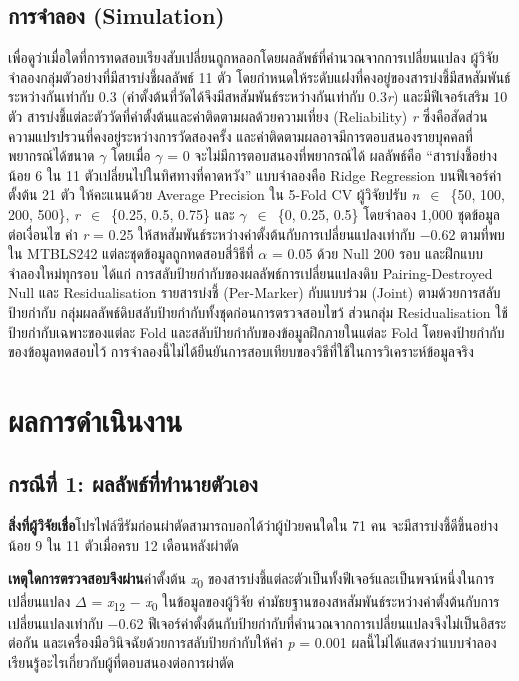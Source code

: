 \documentclass[11pt,a4paper]{article}
\newcommand{\storylabel}[1]{\textbf{#1}\quad}
\begin{document}
\subsection{การจำลอง (Simulation)}
\label{sec:simdesign}
เพื่อดูว่าเมื่อใดที่การทดสอบเรียงสับเปลี่ยนถูกหลอกโดยผลลัพธ์ที่คำนวณจากการเปลี่ยนแปลง
ผู้วิจัยจำลองกลุ่มตัวอย่างที่มีสารบ่งชี้ผลลัพธ์ 11 ตัว
โดยกำหนดให้ระดับแฝงที่คงอยู่ของสารบ่งชี้มีสหสัมพันธ์ระหว่างกันเท่ากับ 0.3
(ค่าตั้งต้นที่วัดได้จึงมีสหสัมพันธ์ระหว่างกันเท่ากับ 0.3\textit{r}) และมีฟีเจอร์เสริม 10 ตัว
สารบ่งชี้แต่ละตัววัดที่ค่าตั้งต้นและค่าติดตามผลด้วยความเที่ยง (Reliability) \textit{r}
ซึ่งคือสัดส่วนความแปรปรวนที่คงอยู่ระหว่างการวัดสองครั้ง
และค่าติดตามผลอาจมีการตอบสนองรายบุคคลที่พยากรณ์ได้ขนาด $\gamma$
โดยเมื่อ $\gamma$ = 0 จะไม่มีการตอบสนองที่พยากรณ์ได้
ผลลัพธ์คือ ``สารบ่งชี้อย่างน้อย 6 ใน 11 ตัวเปลี่ยนไปในทิศทางที่คาดหวัง''
แบบจำลองคือ Ridge Regression บนฟีเจอร์ค่าตั้งต้น 21 ตัว
ให้คะแนนด้วย Average Precision ใน 5-Fold CV
ผู้วิจัยปรับ \textit{n}~$\in$~\{50, 100, 200, 500\},
\textit{r}~$\in$~\{0.25, 0.5, 0.75\} และ $\gamma$~$\in$~\{0, 0.25, 0.5\}
โดยจำลอง 1,000 ชุดข้อมูลต่อเงื่อนไข ค่า \textit{r} = 0.25
ให้สหสัมพันธ์ระหว่างค่าตั้งต้นกับการเปลี่ยนแปลงเท่ากับ −0.62 ตามที่พบใน MTBLS242
แต่ละชุดข้อมูลถูกทดสอบสี่วิธีที่ $\alpha$ = 0.05 ด้วย Null 200 รอบ
และฝึกแบบจำลองใหม่ทุกรอบ ได้แก่ การสลับป้ายกำกับของผลลัพธ์การเปลี่ยนแปลงดิบ
Pairing-Destroyed Null และ Residualisation รายสารบ่งชี้ (Per-Marker)
กับแบบร่วม (Joint) ตามด้วยการสลับป้ายกำกับ
กลุ่มผลลัพธ์ดิบสลับป้ายกำกับทั้งชุดก่อนการตรวจสอบไขว้
ส่วนกลุ่ม Residualisation ใช้ป้ายกำกับเฉพาะของแต่ละ Fold
และสลับป้ายกำกับของข้อมูลฝึกภายในแต่ละ Fold โดยคงป้ายกำกับของข้อมูลทดสอบไว้
การจำลองนี้ไม่ได้ยืนยันการสอบเทียบของวิธีที่ใช้ในการวิเคราะห์ข้อมูลจริง

\section{ผลการดำเนินงาน}
\label{sec:results}

\subsection{กรณีที่ 1: ผลลัพธ์ที่ทำนายตัวเอง}
\label{sec:case1}

\storylabel{สิ่งที่ผู้วิจัยเชื่อ}โปรไฟล์ซีรัมก่อนผ่าตัดสามารถบอกได้ว่าผู้ป่วยคนใดใน 71 คน
จะมีสารบ่งชี้ดีขึ้นอย่างน้อย 9 ใน 11 ตัวเมื่อครบ 12 เดือนหลังผ่าตัด

\storylabel{เหตุใดการตรวจสอบจึงผ่าน}ค่าตั้งต้น \textit{x}\textsubscript{0}
ของสารบ่งชี้แต่ละตัวเป็นทั้งฟีเจอร์และเป็นพจน์หนึ่งในการเปลี่ยนแปลง
$\Delta$ = \textit{x}\textsubscript{12} − \textit{x}\textsubscript{0}
ในข้อมูลของผู้วิจัย ค่ามัธยฐานของสหสัมพันธ์ระหว่างค่าตั้งต้นกับการเปลี่ยนแปลงเท่ากับ −0.62
ฟีเจอร์ค่าตั้งต้นกับป้ายกำกับที่คำนวณจากการเปลี่ยนแปลงจึงไม่เป็นอิสระต่อกัน
และเครื่องมือวินิจฉัยด้วยการสลับป้ายกำกับให้ค่า \textit{p} = 0.001
ผลนี้ไม่ได้แสดงว่าแบบจำลองเรียนรู้อะไรเกี่ยวกับผู้ที่ตอบสนองต่อการผ่าตัด
\end{document}

